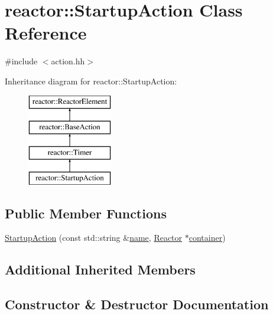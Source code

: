 \hypertarget{classreactor_1_1StartupAction}{}\section{reactor\+:\+:Startup\+Action Class Reference}
\label{classreactor_1_1StartupAction}


{\ttfamily \#include $<$action.\+hh$>$}

Inheritance diagram for reactor\+:\+:Startup\+Action\+:\begin{figure}[H]
\begin{center}
\leavevmode
\includegraphics[height=4.000000cm]{classreactor_1_1StartupAction}
\end{center}
\end{figure}
\subsection*{Public Member Functions}
\begin{DoxyCompactItemize}
\item 
\hyperlink{classreactor_1_1StartupAction_a6377de4a00c57020dbb7cd0d9eb82bce}{Startup\+Action} (const std\+::string \&\hyperlink{classreactor_1_1ReactorElement_a99579f61dbaf5d5d98aebfe26eb8bf77}{name}, \hyperlink{classreactor_1_1Reactor}{Reactor} $\ast$\hyperlink{classreactor_1_1ReactorElement_a25bf298de879a82eefc1ba426be05812}{container})
\end{DoxyCompactItemize}
\subsection*{Additional Inherited Members}


\subsection{Constructor \& Destructor Documentation}
\mbox{\label{classreactor_1_1StartupAction_a6377de4a00c57020dbb7cd0d9eb82bce}} 
